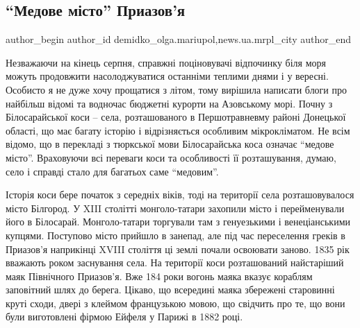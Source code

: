  
 
 
 
 
 
\subsection{\enquote{Медове місто} Приазов'я}
\label{sec:31_08_2020.stz.news.ua.mrpl_city.1.medove_misto_priazovja}
 
\ifcmt
 author_begin
   author_id demidko_olga.mariupol,news.ua.mrpl_city
 author_end
\fi


Незважаючи на кінець серпня, справжні поціновувачі відпочинку біля моря можуть
продовжити насолоджуватися останніми теплими днями і у вересні. Особисто я не
дуже хочу прощатися з літом, тому вирішила написати блоги про найбільш відомі
та водночас бюджетні курорти на Азовському морі. Почну з Білосарайської коси –
села, розташованого в Першотравневму районі Донецької області, що має багату
історію і відрізняється особливим мікрокліматом. Не всім відомо, що в перекладі
з тюркської мови Білосарайська коса означає \enquote{медове місто}. Враховуючи всі
переваги коси та особливості її розташування, думаю, село і справді стало для
багатьох саме \enquote{медовим}.

Історія коси бере початок з середніх віків, тоді на території села
розташовувалося місто Білгород. У XIII столітті монголо-татари захопили місто і
перейменували його в Білосарай. Монголо-татари торгували там з генуезькими і
венеціанськими купцями. Поступово місто прийшло в занепад, але під час
переселення греків в Приазов'я наприкінці XVIII століття ці землі почали
освоювати заново. 1835 рік вважають роком заснування села. На території коси
розташований найстаріший маяк Північного Приазов'я. Вже 184 роки вогонь маяка
вказує кораблям заповітний шлях до берега. Цікаво, що всередині маяка збережені
старовинні круті сходи, двері з клеймом французькою мовою, що свідчить про те,
що вони були виготовлені фірмою Ейфеля у Парижі в 1882 році.

